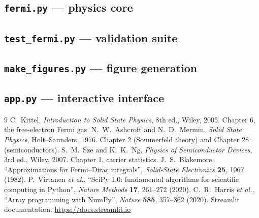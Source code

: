 \documentclass[aps,prb,reprint,nofootinbib]{revtex4-2}
\begin{document}
\subsection{\texttt{fermi.py} --- physics core}


\subsection{\texttt{test\_fermi.py} --- validation suite}


\subsection{\texttt{make\_figures.py} --- figure generation}


\subsection{\texttt{app.py} --- interactive interface}


\twocolumngrid

\begin{thebibliography}{9}
 C.~Kittel, \textit{Introduction to Solid State Physics}, 8th ed., Wiley, 2005.
  Chapter 6, the free-electron Fermi gas.
 N.~W.~Ashcroft and N.~D.~Mermin, \textit{Solid State Physics},
  Holt--Saunders, 1976. Chapter 2 (Sommerfeld theory) and Chapter 28 (semiconductors).
 S.~M.~Sze and K.~K.~Ng, \textit{Physics of Semiconductor Devices}, 3rd ed.,
  Wiley, 2007. Chapter 1, carrier statistics.
 J.~S.~Blakemore, ``Approximations for Fermi--Dirac integrals'',
  \textit{Solid-State Electronics} \textbf{25}, 1067 (1982).
 P.~Virtanen \textit{et al.}, ``SciPy 1.0: fundamental algorithms for scientific
  computing in Python'', \textit{Nature Methods} \textbf{17}, 261--272 (2020).
 C.~R.~Harris \textit{et al.}, ``Array programming with NumPy'',
  \textit{Nature} \textbf{585}, 357--362 (2020).
 Streamlit documentation. \url{https://docs.streamlit.io}
\end{thebibliography}
\end{document}
